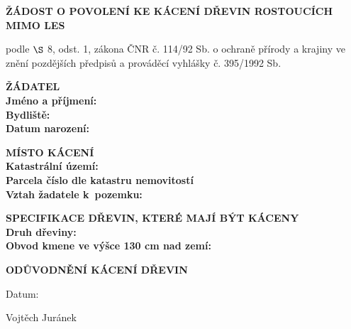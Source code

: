 \documentclass[a4paper,10pt]{report}
\begin{document}
\begin{center}
{\Large \bfseries ŽÁDOST O POVOLENÍ KE KÁCENÍ DŘEVIN ROSTOUCÍCH MIMO LES }\\
\end{center}

\vspace{0.1cm}
\begin{center}
podle $\S$ 8, odst. 1, zákona ČNR č. 114/92 Sb. o ochraně přírody a krajiny ve znění pozdějších předpisů a prováděcí vyhlášky č. 395/1992 Sb.
\end{center}

\vspace{0.5cm}

\begin{flushleft}
{\large \bfseries ŽÁDATEL}\\

\textbf{Jméno a příjmení:} \\
\textbf{Bydliště:} \\
\textbf{Datum narození:} \\
\end{flushleft}

\vspace{0.5cm}

\begin{flushleft}
{\large \bfseries MÍSTO KÁCENÍ}\\

\textbf{Katastrální území:} \\
\textbf{Parcela číslo dle katastru nemovitostí} \\
\textbf{Vztah žadatele k pozemku:} \\
\end{flushleft}

\vspace{0.5cm}

\begin{flushleft}
{\large \bfseries SPECIFIKACE DŘEVIN, KTERÉ MAJÍ BÝT KÁCENY}\\

\textbf{Druh dřeviny:} \\
\textbf{Obvod kmene ve výšce 130 cm nad zemí:} \\
\end{flushleft}

\vspace{0.5cm}

\begin{flushleft}
{\large \bfseries ODŮVODNĚNÍ KÁCENÍ DŘEVIN}\\

\end{flushleft}

\vspace{0.5cm}

\begin{flushleft}
Datum:
\end{flushleft}

\begin{flushright}
Vojtěch Juránek
\end{flushright}
\end{document}
